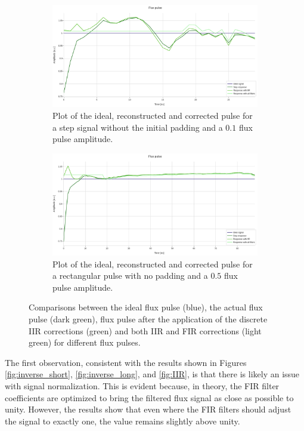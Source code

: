 \begin{figure}[h!]
    \centering
    \begin{subfigure}[t]{0.495\textwidth}
        \includegraphics[width=\textwidth]{figures/png/Cryoscope/filters/all_filters_no_pad.png}
        \caption{Plot of the ideal, reconstructed and corrected pulse for a step signal without the initial padding and a $0.1$ flux pulse amplitude.}
        \label{fig:FIR:nopad}
    \end{subfigure}
    \hfill
    \begin{subfigure}[t]{0.495\textwidth}
        \includegraphics[width=\textwidth]{figures/png/Cryoscope/filters_long/IIR_FIR.png}
        \caption{Plot of the ideal, reconstructed and corrected pulse for a rectangular pulse with no padding and a $0.5$ flux pulse amplitude.}
        \label{fig:FIR:long}
    \end{subfigure}
    \caption{Comparisons between the ideal flux pulse (blue), the actual flux pulse (dark green), flux pulse after the application of the discrete IIR corrections (green) and both IIR and FIR corrections (light green) for different flux pulses.}
    \label{fig:FIR}
\end{figure}

The first observation, consistent with the results shown in Figures \ref{fig:inverse_short}, \ref{fig:inverse_long}, and \ref{fig:IIR}, is that there is likely an issue with signal normalization. 
This is evident because, in theory, the FIR filter coefficients are optimized to bring the filtered flux signal as close as possible to unity. 
However, the results show that even where the FIR filters should adjust the signal to exactly one, the value remains slightly above unity.

